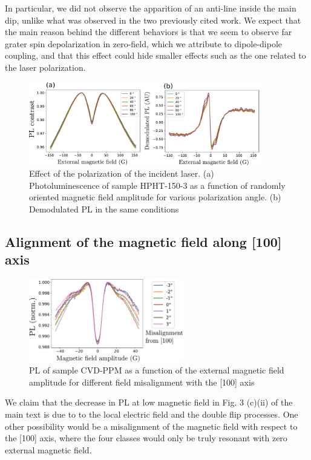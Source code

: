 \documentclass[preprintnumbers,amsmath,amssymb,onecolumn,12pt]{revtex4-2}\usepackage{graphicx}%
\begin{document}
In particular, we did not observe the apparition of an anti-line inside the main dip, unlike what was observed in the two previously cited work. We expect that the main reason behind the different behaviors is that we seem to observe far grater spin depolarization in zero-field, which we attribute to dipole-dipole coupling, and that this effect could hide smaller effects such as the one related to the laser polarization.
\begin{figure}
\includegraphics[width=0.9\textwidth]{Figures_SI/fig_Pola}
\caption{Effect of the polarization of the incident laser. (a) Photoluminescence of sample HPHT-150-3 as a function of randomly oriented magnetic field amplitude for various polarization angle. (b) Demodulated PL in the same conditions}
\label{Pola}
\end{figure}
\subsection{Alignment of the magnetic field along [100] axis}
\begin{figure}
\centering
\includegraphics[width=0.6\textwidth]{Figures_SI/alignement}
\caption{PL of sample CVD-PPM as a function of the external magnetic field amplitude for different field misalignment with the [100] axis}
\label{Alignment}
\end{figure}
We claim that the decrease in PL at low magnetic field in Fig. 3 (c)(ii) of the main text is due to to the local electric field and the double flip processes. One other possibility would be a misalignment of the magnetic field with respect to the [100] axis, where the four classes would only be truly resonant with zero external magnetic field.
\end{document}
